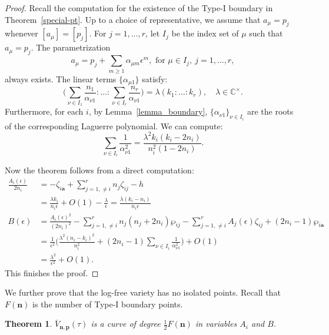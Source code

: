 \documentclass[11pt]{amsart}
\newtheorem{theorem}{Theorem}[section]
\theoremstyle{remark}
\numberwithin{equation}{section}
\begin{document}
\begin{proof}
Recall the computation for the existence of the Type-I boundary in Theorem~\ref{special-pt}. Up to a choice of representative, we assume that $a_\mu = p_j$ whenever $[a_\mu] = [p_j]$. For $j=1,\dots,r$, let $I_j$ be the index set of $\mu$ such that $a_{\mu}=p_j$. The parametrization
\[
    a_\mu = p_j + \sum_{m \geq 1} \alpha_{\mu m} \epsilon^m, \text{ for }\mu \in I_j, \ j=1,\dots,r,
\]
always exists. The linear terms $\{ \alpha_{\mu 1} \}$ satisfy:
\[
    \Big( \sum_{\nu \in I_1} \frac{n_1}{\alpha_{\nu 1}}: \dots: \sum_{\nu \in I_r} \frac{n_r}{\alpha_{\nu 1}}   \Big) = \lambda ( k_1: \dots: k_r ), \quad \lambda \in \mathbb{C}^\times.
\]
Furthermore, for each $i$, by Lemma~\ref{lemma_boundary}, $\{ \alpha_{\nu 1} \}_{\nu \in I_i}$ are the roots of the corresponding Laguerre polynomial. We can compute:
\[  
    \sum_{\nu \in I_i} \frac{1}{\alpha_{\nu 1}^2} = \frac{\lambda^2 k_i (k_i-2n_i)}{n_i^2(1-2n_i)}. 
\]

Now the theorem follows from a direct computation:
\[
\begin{split}
\frac{A_i(\epsilon)}{2n_i} &= - \zeta_{i \mathbf{a}} + \sum_{j = 1, \ne i}^r n_j \zeta_{ij} - h 
\\
&= \frac{\lambda k_i}{n_i \epsilon} + O(1) - \frac{\lambda}{\epsilon} = \frac{\lambda(k_i-n_i)}{n_i\epsilon}
\\
B(\epsilon) &= \frac{A_i(\epsilon)^2}{(2n_i)^2} - \sum_{j = 1, \ne i}^r n_j(n_j + 2n_i) \wp_{ij} - \sum_{j = 1, \neq i}^{r} A_j(\epsilon) \zeta_{ij} + (2n_i - 1) \wp_{i \mathbf{a}} 
\\
&= \frac{1}{\epsilon^2} \Bigg( \frac{\lambda^2 (n_i-k_i)^2}{n_i^2} + (2n_i-1) \sum_{\nu \in I_i} \frac{1}{\alpha_{\nu 1}^2} \Bigg) + O(1)
\\
&= \frac{\lambda^2}{\epsilon^2} + O(1). 
\end{split}
\]
This finishes the proof.
\end{proof}
We further prove that the log-free variety has no isolated points. Recall that $F(\mathbf{n})$ is the number of Type-I boundary points. 
\begin{theorem} \label{thm:log_free_curveness}
$\overline{V}_{\mathbf{n},\mathbf{p}}(\tau)$ is a curve of degree $\frac{1}{2} F(\mathbf{n})$ in variables $A_i$ and $B$.
\end{theorem}
\end{document}
